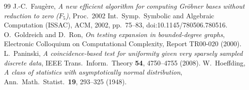 \documentclass[11pt]{article}
\theoremstyle{definition}
\theoremstyle{remark}
\begin{document}
\begin{thebibliography}{99}
 J.-C.~Faug\`ere, \emph{A new efficient algorithm for computing Gr\"obner bases without reduction to zero ($F_5$)}, Proc.\ 2002 Int.\ Symp.\ Symbolic and Algebraic Computation (ISSAC), ACM, 2002, pp.~75--83, doi:10.1145/780506.780516.
 O.~Goldreich and D.~Ron, \emph{On testing expansion in bounded-degree graphs}, Electronic Colloquium on Computational Complexity, Report TR00-020 (2000).
 L.~Paninski, \emph{A coincidence-based test for uniformity given very sparsely sampled discrete data}, IEEE Trans.\ Inform.\ Theory \textbf{54}, 4750--4755 (2008).
 W.~Hoeffding, \emph{A class of statistics with asymptotically normal distribution}, Ann.\ Math.\ Statist.\ \textbf{19}, 293--325 (1948).
\end{thebibliography}
\end{document}
